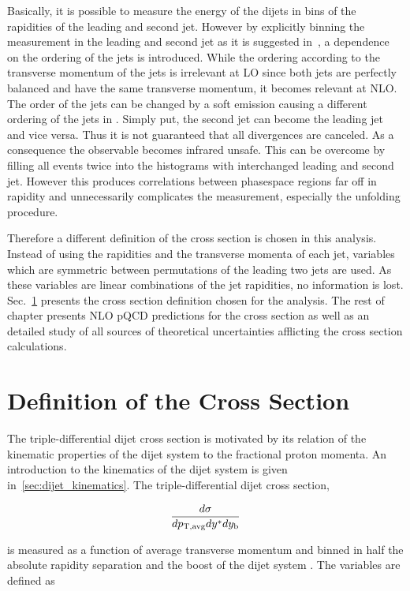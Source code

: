 Basically, it is possible to measure the energy of the dijets in bins of the
rapidities of the leading and second jet. However by explicitly binning the
measurement in the leading and second jet as it is suggested
in~\cite{Giele:1994xd}, a dependence on the ordering of the jets is introduced.
While the ordering according to the transverse momentum of the jets is
irrelevant at LO since both jets are perfectly balanced and have the same
transverse momentum, it becomes relevant at NLO. The order of the jets can be
changed by a soft emission causing a different ordering of the jets in \pt.
Simply put, the second jet can become the leading jet and vice versa. Thus it is
not guaranteed that all divergences are canceled. As a consequence the
observable becomes infrared unsafe. This can be overcome by filling all events
twice into the histograms with interchanged leading and second jet. However this
produces correlations between phasespace regions far off in rapidity and
unnecessarily complicates the measurement, especially the unfolding procedure.

Therefore a different definition of the cross section is chosen in this
analysis. Instead of using the rapidities and the transverse momenta of each
jet, variables which are symmetric between permutations of the leading two
jets are used. As these variables are linear combinations of the jet rapidities,
no information is lost. Sec.~\ref{sec:crosssection_definition} presents the
cross section definition chosen for the analysis. The rest of chapter presents
NLO pQCD predictions for the cross section as well as an detailed study of all
sources of theoretical uncertainties afflicting the cross section calculations.

\section{Definition of the Cross Section}
\label{sec:crosssection_definition}

The triple-differential dijet cross section is motivated by its relation of the
kinematic properties of the dijet system to the fractional proton momenta. An
introduction to the kinematics of the dijet system is given
in~\ref{sec:dijet_kinematics}. The triple-differential dijet cross section,

\begin{equation*}
    \frac{d \sigma}{d p_{\mathrm{T,avg}} dy^* d y_{\mathrm{b}}}
\end{equation*}

is measured as a function of average transverse momentum \ptavg and binned in
half the absolute rapidity separation \ystar and the boost of the dijet system
\yboost. The variables are defined as

